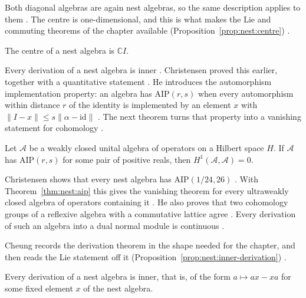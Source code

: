 Both diagonal algebras are again nest algebras, so the same description applies to
them \cite[p.~308]{Cheung2003}. The centre is one-dimensional, and this is what
makes the Lie and commuting theorems of the chapter available (Proposition~\ref{prop:nest:centre})
\cite[Proposition~20, p.~309]{Cheung2003}.\begin{proposition}\label{prop:nest:centre}
The centre of a nest algebra is $\mathbb{C}I$.
\end{proposition}

Every derivation of a nest algebra is inner
\cite[Proposition~21, p.~309]{Cheung2003}. Christensen proved this earlier,
together with a quantitative statement \cite[Theorem~3.9, p.~160]{Christensen1977}.
He introduces the automorphism implementation property: an algebra has
AIP$(r,s)$ when every automorphism within distance $r$ of the identity is
implemented by an element $x$ with
$\|I-x\|\le s\|\alpha-\mathrm{id}\|$ \cite[Definition~3.1, p.~158]{Christensen1977}.
The next theorem turns that property into a vanishing statement for cohomology
\cite[Theorem~3.2, p.~158]{Christensen1977}.

\begin{theorem}\label{thm:nest:aip}
Let $\mathcal{A}$ be a weakly closed unital algebra of operators on a Hilbert
space $H$. If $\mathcal{A}$ has AIP$(r,s)$ for some pair of positive reals, then
$H^1(\mathcal{A},\mathcal{A})=0$.
\end{theorem}

Christensen shows that every nest algebra has AIP$(1/24,26)$
\cite[Corollary~3.10, p.~161]{Christensen1977}. With
Theorem~\ref{thm:nest:aip} this gives the vanishing theorem for every ultraweakly
closed algebra of operators containing it
\cite[Corollary~3.11, p.~161]{Christensen1977}. He also proves that two cohomology
groups of a reflexive algebra with a commutative lattice agree
\cite[Proposition~3.4, p.~158]{Christensen1977}. Every derivation of such an
algebra into a dual normal module is continuous
\cite[Corollary~2.3, p.~157]{Christensen1977}.

Cheung records the derivation theorem in the shape needed for the chapter, and
then reads the Lie statement off it (Proposition~\ref{prop:nest:inner-derivation})
\cite[Proposition~21, p.~309]{Cheung2003}.\begin{proposition}\label{prop:nest:inner-derivation}
Every derivation of a nest algebra is inner, that is, of the form
$a\mapsto ax-xa$ for some fixed element $x$ of the nest algebra.
\end{proposition}

